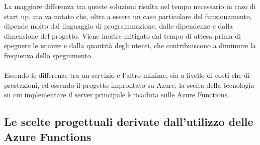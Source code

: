 La maggiore differenza tra queste soluzioni risulta nel tempo necessario in caso di start up,
ma va notato che, oltre a essere un caso particolare del funzionamento,
dipende molto dal linguaggio di programmazione,
dalle dipendenze e dalla dimensione del progetto.
Viene inoltre mitigato dal tempo di attesa prima di spegnere le istanze e
dalla quantità degli utenti,
che contribuiscono a diminuire la frequenza dello spegnimento.\\
\\
Essendo le differenze tra un servizio e l'altro minime,
sia a livello di costi che di prestazioni,
ed essendo il progetto improntato su Azure,
la scelta della tecnologia su cui implementare il server principale è ricaduta sulle Azure Functions.\\

\subsection{Le scelte progettuali derivate dall'utilizzo delle Azure Functions}

